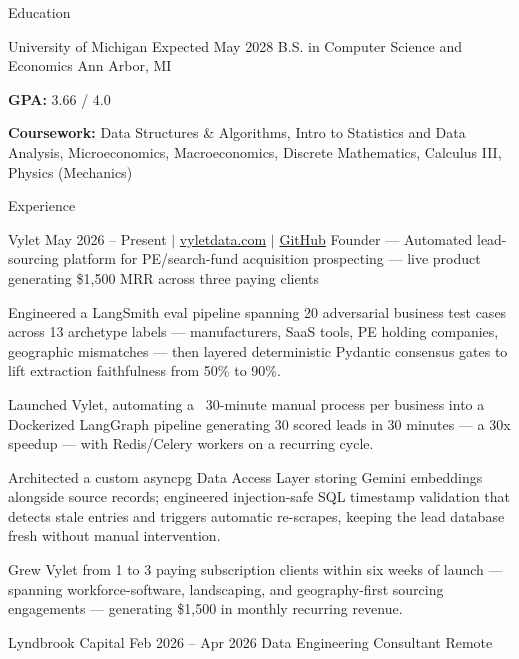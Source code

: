 \documentclass[
	11pt
]{../../../template}
\begin{document}
	\begin{rSection}{E}{ducation}
		\begin{rSectionEntry}
			{University of Michigan}
			{Expected May 2028}
			{B.S. in Computer Science and Economics}
			{}
			{Ann Arbor, MI}

			\item \textbf{GPA:} 3.66 / 4.0
			\item \textbf{Coursework:} Data Structures \& Algorithms, Intro to Statistics and Data Analysis, Microeconomics, Macroeconomics, Discrete Mathematics, Calculus III, Physics (Mechanics)
		\end{rSectionEntry}
	\end{rSection}

	\begin{rSection}{E}{xperience}
		\begin{rSectionEntry}
			{Vylet}
			{May 2026 -- Present $\vert$ \href{https://vyletdata.com}{vyletdata.com} $\vert$ \href{https://github.com/Verdent06/Lead-Gen-Agentic-Pipeline}{GitHub}}
			{Founder --- Automated lead-sourcing platform for PE/search-fund acquisition prospecting --- live product generating \$1,500 MRR across three paying clients}
			{}
			{}

			\item Engineered a LangSmith eval pipeline spanning 20 adversarial business test cases across 13 archetype labels --- manufacturers, SaaS tools, PE holding companies, geographic mismatches --- then layered deterministic Pydantic consensus gates to lift extraction faithfulness from 50\% to 90\%.
			\item Launched Vylet, automating a ~30-minute manual process per business into a Dockerized LangGraph pipeline generating 30 scored leads in 30 minutes --- a 30x speedup --- with Redis/Celery workers on a recurring cycle.
			\item Architected a custom asyncpg Data Access Layer storing Gemini embeddings alongside source records; engineered injection-safe SQL timestamp validation that detects stale entries and triggers automatic re-scrapes, keeping the lead database fresh without manual intervention.
			\item Grew Vylet from 1 to 3 paying subscription clients within six weeks of launch --- spanning workforce-software, landscaping, and geography-first sourcing engagements --- generating \$1,500 in monthly recurring revenue.
		\end{rSectionEntry}

		\begin{rSectionEntry}
			{Lyndbrook Capital}
			{Feb 2026 -- Apr 2026}
			{Data Engineering Consultant}
			{}
			{Remote}


\end{rSectionEntry}
\end{rSection}
\end{document}
